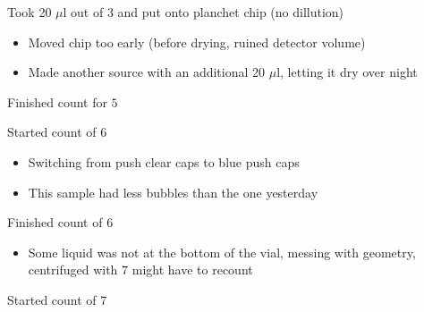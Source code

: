 \documentclass[idxtotoc,hyperref,openany,oneside]{labbook} %
\newcommand{\cmark}{\ding{51}}%
\newcommand{\done}{\rlap{$\square$}{\raisebox{2pt}{\large\hspace{1pt}\cmark}}%
  \hspace{-2.5pt}}
\begin{document}

\begin{todolist}
\item[\done]{Took 20 $\mu$l out of $\boxed{3}$ and put
  onto planchet chip (no dillution)}
  \begin{itemize}
  \item{Moved chip too early (before drying, ruined
    detector volume)}
  \item{Made another source with an additional 20 $\mu$l,
    letting it dry over night}
  \end{itemize}
\end{todolist}






\begin{todolist}
\item[\done]{Finished count for $\boxed{5}$}
\item[\done]{Started count of $\boxed{6}$}
  \begin{itemize}
  \item{Switching from push clear caps to blue push caps}
  \item{This sample had less bubbles than the one yesterday}
  \end{itemize}
\item[\done]{Finished count of $\boxed{6}$}
  \begin{itemize}
  \item{Some liquid was not at the bottom of the vial,
    messing with geometry, centrifuged with $\boxed{7}$
    might have to recount}
  \end{itemize}
\item[\done]{Started count of $\boxed{7}$}
  
\end{todolist}


\end{document}

